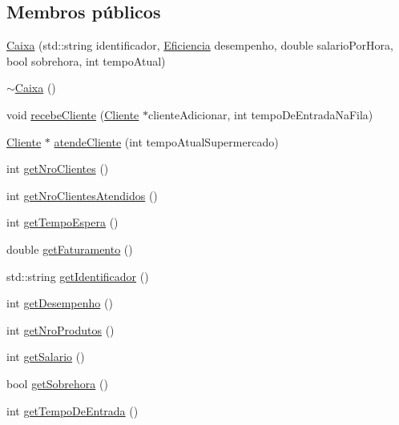 \subsection*{Membros públicos}
\begin{DoxyCompactItemize}
\item 
\hyperlink{class_caixa_aad38f50e3c8db674bb5c0ee521665d83}{Caixa} (std\+::string identificador, \hyperlink{class_caixa_a0e98d0cd8dc2ff4f73d637d73f7bbe85}{Eficiencia} desempenho, double salario\+Por\+Hora, bool sobrehora, int tempo\+Atual)
\item 
\hyperlink{class_caixa_a3c83a69e735b33cb42b90147bf94563e}{$\sim$\+Caixa} ()
\item 
void \hyperlink{class_caixa_a49d1c16baa5cba526d2fe483426d1ca7}{recebe\+Cliente} (\hyperlink{class_cliente}{Cliente} $\ast$cliente\+Adicionar, int tempo\+De\+Entrada\+Na\+Fila)
\item 
\hyperlink{class_cliente}{Cliente} $\ast$ \hyperlink{class_caixa_a05be1498241eb73750a857ec5b9a0ddf}{atende\+Cliente} (int tempo\+Atual\+Supermercado)
\item 
int \hyperlink{class_caixa_a4548bf9e0d9fe4639d85f525dfa284eb}{get\+Nro\+Clientes} ()
\item 
int \hyperlink{class_caixa_aab9109ad0b89fbce6048e6fb3e2f13c3}{get\+Nro\+Clientes\+Atendidos} ()
\item 
int \hyperlink{class_caixa_a07735848b240d260fcd573c7642fce60}{get\+Tempo\+Espera} ()
\item 
double \hyperlink{class_caixa_a2b903d4d0736ea35f09f7e5536fdd71d}{get\+Faturamento} ()
\item 
std\+::string \hyperlink{class_caixa_a6bc55188d8667812c23223bb19488fef}{get\+Identificador} ()
\item 
int \hyperlink{class_caixa_a7fea27e506f6a819c133c72c1bece67e}{get\+Desempenho} ()
\item 
int \hyperlink{class_caixa_ad84ab7878e10d3eeea3025a3594e66b7}{get\+Nro\+Produtos} ()
\item 
int \hyperlink{class_caixa_a05fe593cdbbd86a3633ac58edda520a7}{get\+Salario} ()
\item 
bool \hyperlink{class_caixa_a3f846659f43087a6963ecfb7b51f858c}{get\+Sobrehora} ()
\item 
int \hyperlink{class_caixa_a126611a1682a8720732b48da2759cfca}{get\+Tempo\+De\+Entrada} ()
\end{DoxyCompactItemize}


